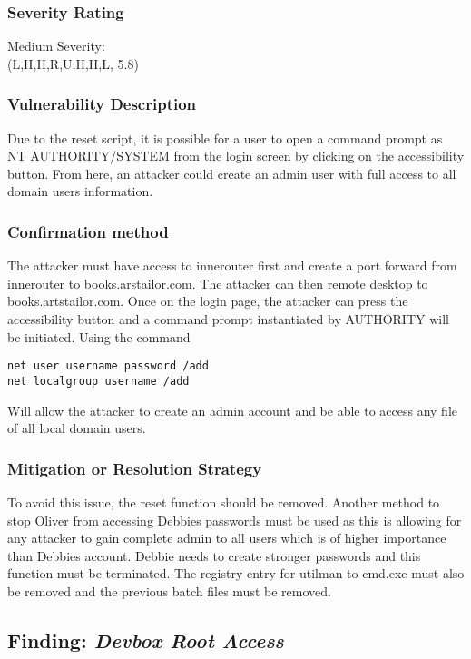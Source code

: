 \documentclass[notitlepage]{article}
\begin{document}
	\subsubsection*{Severity Rating}
    Medium Severity:  \\
    \cvss(L,H,H,R,U,H,H,L, 5.8)
		
  	\subsubsection*{Vulnerability Description}
  		Due to the reset script, it is possible for a user to open a command prompt as NT AUTHORITY/SYSTEM from the login screen
        by clicking on the accessibility button. From here, an attacker could create an admin user with full access to all domain users
        information.

  	\subsubsection*{Confirmation method}
  	The attacker must have access to innerouter first and create a port forward from innerouter to books.arstailor.com. The attacker can then remote
    desktop to books.artstailor.com. Once on the login page, the attacker can press the accessibility button and a command prompt instantiated by AUTHORITY
    will be initiated. Using the command
\begin{verbatim}
net user username password /add
net localgroup username /add
\end{verbatim}
    Will allow the attacker to create an admin account and be able to access any file of all local domain users.

    \subsubsection*{Mitigation or Resolution Strategy}
    To avoid this issue, the reset function should be removed. Another method to stop Oliver from accessing Debbies passwords must be used as this is allowing for any
    attacker to gain complete admin to all users which is of higher importance than Debbies account. Debbie needs to create stronger passwords and this function must be 
    terminated. The registry entry for utilman to cmd.exe must also be removed and the previous batch files must be removed.





  \subsection{Finding: \emph{Devbox Root Access}}
  
\end{document}
